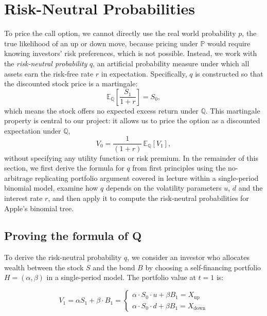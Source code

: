\documentclass[12pt, a4paper]{article}
\begin{document}
\section{Risk-Neutral Probabilities}
\label{sec:riskneutral}

To price the call option, we cannot directly use the 
real world probability $p$, the true likelihood of an up or down move, because 
pricing under $\mathbb{P}$ would require knowing investors' risk preferences, which is not possible. 
Instead, we work with the \textit{risk-neutral probability} $q$, an artificial 
probability measure under which all assets earn the risk-free rate $r$ in 
expectation. Specifically, $q$ is constructed so that the discounted stock price 
is a martingale:
\[
    \mathbb{E}_{\mathbb{Q}}\!\left[\frac{S_1}{1+r}\right] = S_0,
\]
which means the stock offers no expected excess return under $\mathbb{Q}$. 
This martingale property is central to our project: it allows us to price the 
option as a discounted expectation under $\mathbb{Q}$,
\[
    V_0 = \frac{1}{(1+r)}\,\mathbb{E}_{\mathbb{Q}}[V_1],
\]
without specifying any utility function or risk premium. In the remainder of 
this section, we first derive the formula for $q$ from first principles using 
the no-arbitrage replicating portfolio argument covered in lecture within a 
single-period binomial model, examine how $q$ depends on the volatility 
parameters $u$, $d$ and the interest rate $r$, and then apply it to compute 
the risk-neutral probabilities for Apple's binomial tree.
\vspace{1em}

\subsection{Proving the formula of Q}

\noindent To derive the risk-neutral probability $q$, we consider an investor who allocates 
wealth between the stock $S$ and the bond $B$ by choosing a self-financing
portfolio $H = (\alpha, \beta)$ in a single-period model. The portfolio value at $t=1$ is:

\vspace{1em}
\[
V_1 = \alpha S_1 + \beta \cdot B_1 =
\left\{
\begin{array}{l}
\alpha \cdot S_0 \cdot u + \beta B_1 = X_{\text{up}} \\[4pt]
\alpha \cdot S_0 \cdot d + \beta B_1 = X_{\text{down}}
\end{array}
\right.
\]
\vspace{2em}
\end{document}
